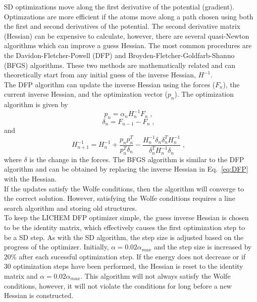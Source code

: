 \documentclass[12pt]{report}
\begin{document}
SD optimizations move along the first derivative of the potential (gradient).
Optimzations are more efficient if the atoms move along a path chosen using
both the first and second derivatives of the potential.
The second derivative matrix (Hessian) can be expensive to calculate, however,
there are several quasi-Newton algorithms which can improve a guess Hessian.
The most common procedures are the Davidon-Fletcher-Powell (DFP) and
Broyden-Fletcher-Goldfarb-Shanno (BFGS) algorithms.
These two methods are mathematically related and can theoretically start from
any initial guess of the inverse Hessian, $H^{-1}$. \\

The DFP algorithm can update the inverse Hessian using the forces ($F_n$), the
current inverse Hessian, and the optimization vector ($p_n$).
The optimization algorithm is given by
\begin{equation}
 p_n = \alpha_n H_n^{-1} F_n \; ,
\end{equation}
\begin{equation}
 \delta_n = F_{n-1}-F_n \; ,
\end{equation}
and
\begin{equation}
 \label{eq:DFP}
 H_{n+1}^{-1} = H_n^{-1} + \frac{p_n p_n^T}{p_n^T \delta_n} -
 \frac{H_n^{-1} \delta_n \delta_n^T H_n^{-1}}{\delta_n^T H_n^{-1} \delta_n}
 \; ,
\end{equation}
where $\delta$ is the change in the forces.
The BFGS algorithm is similar to the DFP algorithm and can be obtained by
replacing the inverse Hessian in Eq.\ \ref{eq:DFP} with the Hessian. \\

If the updates satisfy the Wolfe conditions, then the algorithm will converge
to the correct solution.
However, satisfying the Wolfe conditions requires a line search algorithm and
storing old structures. \\

To keep the LICHEM DFP optimizer simple, the guess inverse Hessian is chosen
to be the identity matrix, which effectively causes the first optimization
step to be a SD step.
As with the SD algorithm, the step size is adjusted based on the progress of
the optimizer.
Initially, $\alpha=0.02\alpha_{max}$ and the step size is increased by 20\%
after each sucessful optimization step.
If the energy does not decrease or if 30 optimization steps have been
performed, the Hessian is reset to the identity matrix and
$\alpha=0.02\alpha_{max}$.
This algorithm will not always satisfy the Wolfe conditions, however, it will
not violate the conditions for long before a new Hessian is constructed.
\end{document}
